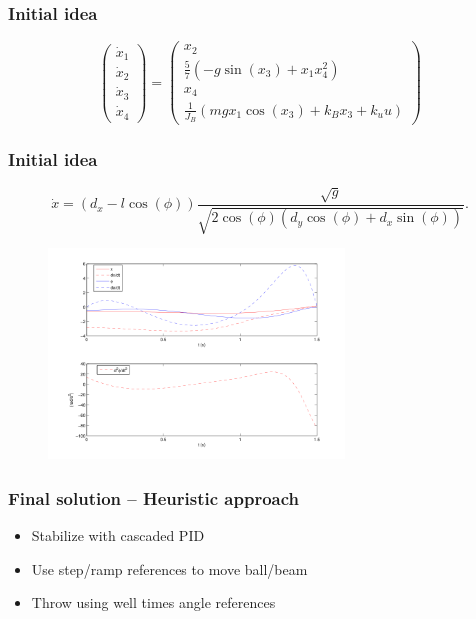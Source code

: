 \documentclass[
compress]
{beamer}
\begin{document}
\begin{frame}
\frametitle{Initial idea}

\begin{equation*}
\begin{pmatrix}
\dot{x}_{1}\\
\dot{x}_{2}\\
\dot{x}_{3}\\
\dot{x}_{4}
\end{pmatrix}=\begin{pmatrix}x_{2}\\
\frac{5}{7}\left(-g\sin(x_{3})+x_{1}x_{4}^{2}\right)\\
x_{4}\\
\frac{1}{J_B}(mgx_{1}\cos(x_3)+k_Bx_3+k_{u}u)
\end{pmatrix}
\end{equation*}
\begin{figure}
\centering
\scalebox{0.7}{}
\end{figure}
\end{frame}

\begin{frame}
\frametitle{Initial idea}
\[
\dot{x}=\left(d_{x}-l\cos(\phi)\right)\frac{\sqrt{g}}{\sqrt{2\cos(\phi)\left(d_{y}\cos(\phi)+d_{x}\sin(\phi)\right)}}.
\]
\begin{figure}
\includegraphics[width=0.7\textwidth]{ballbeammatlab}
\end{figure}

\end{frame}

\begin{frame}
\frametitle{Final solution -- Heuristic approach}
\begin{itemize}
\item Stabilize with cascaded PID
\item Use step/ramp references to move ball/beam
\item Throw using well times angle references
\end{itemize}
\end{frame}
\end{document}
